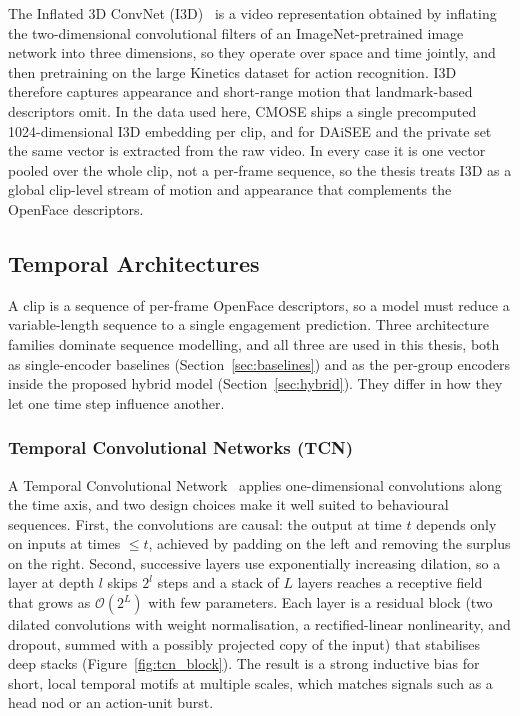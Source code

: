 \documentclass[../main.tex]{subfiles}
\begin{document}
The Inflated 3D ConvNet (I3D)~\cite{i3d} is a video representation obtained by inflating the two-dimensional convolutional filters of an ImageNet-pretrained image network into three dimensions, so they operate over space and time jointly, and then pretraining on the large Kinetics dataset for action recognition. I3D therefore captures appearance and short-range motion that landmark-based descriptors omit. In the data used here, CMOSE ships a single precomputed 1024-dimensional I3D embedding per clip, and for DAiSEE and the private set the same vector is extracted from the raw video. In every case it is one vector pooled over the whole clip, not a per-frame sequence, so the thesis treats I3D as a global clip-level stream of motion and appearance that complements the OpenFace descriptors.

\FloatBarrier
\subsection{Temporal Architectures}
\label{sec:temporal}

A clip is a sequence of per-frame OpenFace descriptors, so a model must reduce a variable-length sequence to a single engagement prediction. Three architecture families dominate sequence modelling, and all three are used in this thesis, both as single-encoder baselines (Section~\ref{sec:baselines}) and as the per-group encoders inside the proposed hybrid model (Section~\ref{sec:hybrid}). They differ in how they let one time step influence another.

\subsubsection{Temporal Convolutional Networks (TCN)}

A Temporal Convolutional Network~\cite{tcn} applies one-dimensional convolutions along the time axis, and two design choices make it well suited to behavioural sequences. First, the convolutions are causal: the output at time $t$ depends only on inputs at times $\le t$, achieved by padding on the left and removing the surplus on the right. Second, successive layers use exponentially increasing dilation, so a layer at depth $l$ skips $2^{l}$ steps and a stack of $L$ layers reaches a receptive field that grows as $\mathcal{O}(2^{L})$ with few parameters. Each layer is a residual block (two dilated convolutions with weight normalisation, a rectified-linear nonlinearity, and dropout, summed with a possibly projected copy of the input) that stabilises deep stacks (Figure~\ref{fig:tcn_block}). The result is a strong inductive bias for short, local temporal motifs at multiple scales, which matches signals such as a head nod or an action-unit burst.
\end{document}
